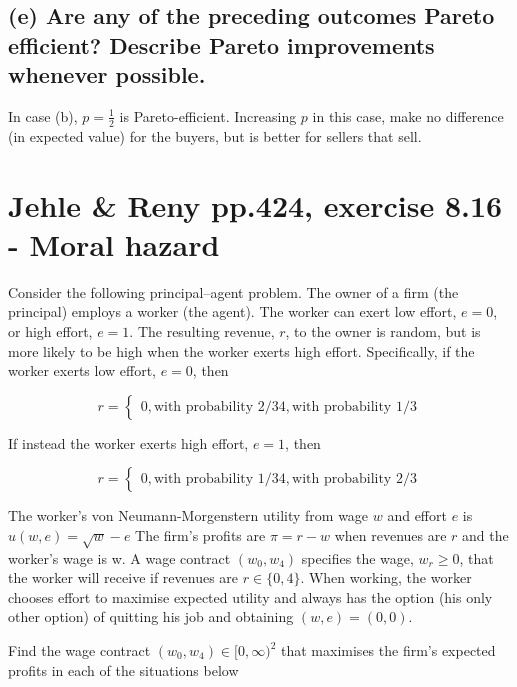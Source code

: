 \documentclass{article}
\begin{document}
\subsection*{(e) Are any of the preceding outcomes Pareto efficient? Describe Pareto improvements whenever
possible.}

In case (b), $p=\tfrac12$ is Pareto-efficient. Increasing $p$ in this case, make no difference (in expected value) for the buyers, but is better for sellers that sell.

\bigskip

\section{Jehle \& Reny pp.424, exercise 8.16 - Moral hazard}

Consider the following principal–agent problem. The owner of a firm (the principal) employs a
worker (the agent). The worker can exert low effort, $e = 0$, or high effort, $e = 1$. The resulting
revenue, $r$, to the owner is random, but is more likely to be high when the worker exerts high effort.
Specifically, if the worker exerts low effort, $e = 0$, then


\begin{equation}
r =
    \begin{cases}
0, \text{with probability 2/3}
4, \text{with probability 1/3}
    \end{cases}
\nonumber
\end{equation}
	

If instead the worker exerts high effort, $e = 1$, then

\begin{equation}
r =
    \begin{cases}
0, \text{with probability 1/3}
4, \text{with probability 2/3}
    \end{cases}
\nonumber
\end{equation}


The worker's von Neumann-Morgenstern utility from wage $w$ and effort $e$ is $u(w, e) = \sqrt{w} -e$
The firm's profits are $\pi = r - w$ when revenues are $r$ and the worker's wage is w. A wage contract
$(w_0, w_4)$ specifies the wage, $w_r \ge 0$, that the worker will receive if revenues are $r \in \{0, 4\}$. When
working, the worker chooses effort to maximise expected utility and always has the option (his only
other option) of quitting his job and obtaining $(w, e) = (0, 0)$.

Find the wage contract $(w_0, w_4) \in [0,\infty)^2$ that maximises the firm's expected profits in each
of the situations below
\end{document}
